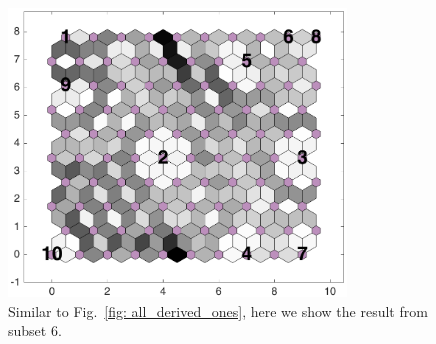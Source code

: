 \begin{figure}
        \centering
        \includegraphics[width=0.8\textwidth]{../../images0.01/M31/2D/image_subsets/subset4_dist_with_hits_t.png}
    \caption{Similar to Fig.~\ref{fig: all_derived_ones}, here we show the result from subset 6.}
    \label{fig: subset4}
\end{figure}